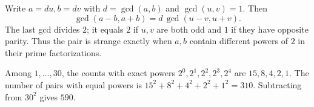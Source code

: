Write $a=du,b=dv$ with $d=\gcd(a,b)$ and $\gcd(u,v)=1$. Then
\[
\gcd(a-b,a+b)=d\,\gcd(u-v,u+v).
\]
The last gcd divides $2$; it equals $2$ if $u,v$ are both odd and $1$ if they have opposite parity. Thus the pair is strange exactly when $a,b$ contain different powers of $2$ in their prime factorizations.

Among $1,\ldots,30$, the counts with exact powers $2^0,2^1,2^2,2^3,2^4$ are $15,8,4,2,1$. The number of pairs with equal powers is $15^2+8^2+4^2+2^2+1^2=310$. Subtracting from $30^2$ gives $\boxed{590}$.
